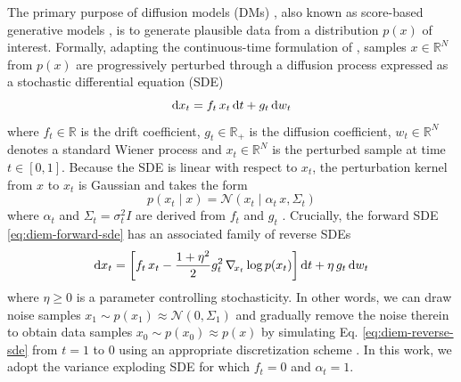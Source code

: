 The primary purpose of diffusion models (DMs) \cite{sohl-dickstein2015deep, ho2020denoising}, also known as score-based generative models \cite{song2019generative, song2021scorebased}, is to generate plausible data from a distribution $p(x)$ of interest. Formally, adapting the continuous-time formulation of \textcite{song2021scorebased}, samples $x \in \mathbb{R}^N$ from $p(x)$ are progressively perturbed through a diffusion process expressed as a stochastic differential equation (SDE)
\begin{equation} \label{eq:diem-forward-sde}
    \operatorname{d}\!{x_t} = f_t \, x_t \operatorname{d}\!{t} + g_t \operatorname{d}\!{w_t}
\end{equation}
where $f_t \in \mathbb{R}$ is the drift coefficient, $g_t \in \mathbb{R}_+$ is the diffusion coefficient, $w_t \in \mathbb{R}^N$ denotes a standard Wiener process and $x_t \in \mathbb{R}^N$ is the perturbed sample at time $t \in [0, 1]$. Because the SDE is linear with respect to $x_t$, the perturbation kernel from $x$ to $x_t$ is Gaussian and takes the form
\begin{equation}
    p(x_t \mid x) = \mathcal{N}(x_t \mid \alpha_t \, x, \Sigma_t)
\end{equation}
where $\alpha_t$ and $\Sigma_t = \sigma_t^2 I$ are derived from $f_t$ and $g_t$ \cite{anderson1982reversetime, sarkka2019applied, song2021scorebased, zhang2023fast}. Crucially, the forward SDE \eqref{eq:diem-forward-sde} has an associated family of reverse SDEs \cite{anderson1982reversetime, sarkka2019applied, song2021scorebased, zhang2023fast}
\begin{equation} \label{eq:diem-reverse-sde}
    \operatorname{d}\!{x_t} = \left[ f_t \, x_t - \frac{1 + \eta^2}{2} g_t^2 \, \nabla_{\!{x_t}} \log p(x_t) \right] \operatorname{d}\!{t} + \eta \, g_t \operatorname{d}\!{w_t}
\end{equation}
where $\eta \geq 0$ is a parameter controlling stochasticity. In other words, we can draw noise samples $x_1 \sim p(x_1) \approx \mathcal{N}(0, \Sigma_1)$ and gradually remove the noise therein to obtain data samples $x_0 \sim p(x_0) \approx p(x)$ by simulating Eq. \eqref{eq:diem-reverse-sde} from $t = 1$ to $0$ using an appropriate discretization scheme \cite{song2019generative, ho2020denoising, song2021denoising, song2021scorebased, karras2022elucidating, lipman2023flow, zhang2023fast}. In this work, we adopt the variance exploding SDE \cite{song2019generative} for which $f_t = 0$ and $\alpha_t = 1$.

